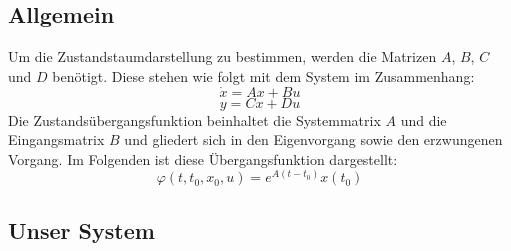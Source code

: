 




\subsection{Allgemein}
Um die Zustandstaumdarstellung zu bestimmen, werden die Matrizen $A$, $B$, $C$ und $D$ benötigt. Diese stehen wie folgt mit dem System im Zusammenhang:
\begin{equation*}
  \dot x = Ax + Bu
\end{equation*}
\begin{equation*}
  y = Cx + Du
\end{equation*}
Die Zustandsübergangsfunktion beinhaltet die Systemmatrix $A$ und die Eingangsmatrix $B$ und gliedert sich in den Eigenvorgang sowie den erzwungenen Vorgang. Im Folgenden ist diese Übergangsfunktion dargestellt:
\begin{equation*}
  \varphi (t,t_0,x_0,u) = e^{A(t-t_0)}x(t_0)
\end{equation*}



\subsection{Unser System}
